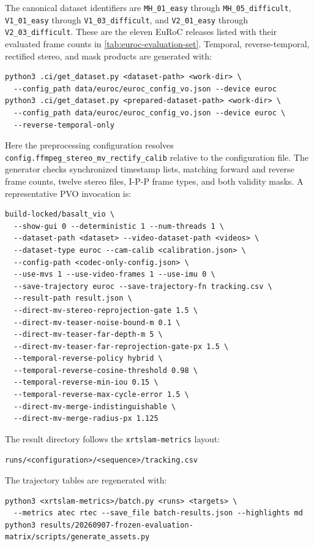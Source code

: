 The canonical dataset identifiers are \texttt{MH\_01\_easy} through
\texttt{MH\_05\_difficult}, \texttt{V1\_01\_easy} through
\texttt{V1\_03\_difficult}, and \texttt{V2\_01\_easy} through
\texttt{V2\_03\_difficult}. These are the eleven EuRoC releases listed with
their evaluated frame counts in \autoref{tab:euroc-evaluation-set}. Temporal,
reverse-temporal, rectified stereo, and mask products are generated with:

\begin{lstlisting}
python3 .ci/get_dataset.py <dataset-path> <work-dir> \
  --config_path data/euroc/euroc_config_vo.json --device euroc
python3 .ci/get_dataset.py <prepared-dataset-path> <work-dir> \
  --config_path data/euroc/euroc_config_vo.json --device euroc \
  --reverse-temporal-only
\end{lstlisting}

Here the preprocessing configuration resolves
\texttt{config.ffmpeg\_stereo\_mv\_rectify\_calib} relative to the configuration
file. The generator checks synchronized timestamp lists, matching forward and
reverse frame counts, twelve stereo files, I-P-P frame types, and both validity
masks. A representative PVO invocation is:

\begin{lstlisting}
build-locked/basalt_vio \
  --show-gui 0 --deterministic 1 --num-threads 1 \
  --dataset-path <dataset> --video-dataset-path <videos> \
  --dataset-type euroc --cam-calib <calibration.json> \
  --config-path <codec-only-config.json> \
  --use-mvs 1 --use-video-frames 1 --use-imu 0 \
  --save-trajectory euroc --save-trajectory-fn tracking.csv \
  --result-path result.json \
  --direct-mv-stereo-reprojection-gate 1.5 \
  --direct-mv-teaser-noise-bound-m 0.1 \
  --direct-mv-teaser-far-depth-m 5 \
  --direct-mv-teaser-far-reprojection-gate-px 1.5 \
  --temporal-reverse-policy hybrid \
  --temporal-reverse-cosine-threshold 0.98 \
  --temporal-reverse-min-iou 0.15 \
  --temporal-reverse-max-cycle-error 1.5 \
  --direct-mv-merge-indistinguishable \
  --direct-mv-merge-radius-px 1.125
\end{lstlisting}

The result directory follows the \texttt{xrtslam-metrics} layout:

\begin{lstlisting}
runs/<configuration>/<sequence>/tracking.csv
\end{lstlisting}

The trajectory tables are regenerated with:

\begin{lstlisting}
python3 <xrtslam-metrics>/batch.py <runs> <targets> \
  --metrics atec rtec --save_file batch-results.json --highlights md
python3 results/20260907-frozen-evaluation-matrix/scripts/generate_assets.py
\end{lstlisting}

